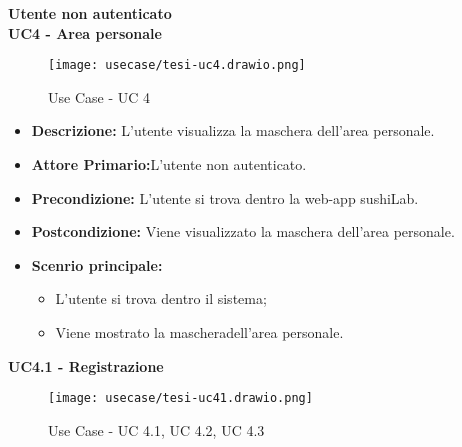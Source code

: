 \textbf{Utente non autenticato}\\
\textbf{UC4 - Area personale}
\begin{figure}[H]
    \centering
    \texttt{[image: usecase/tesi-uc4.drawio.png]}
    \caption{Use Case - UC 4}
\end{figure}
\begin{itemize}
    \item \textbf{Descrizione:} L'utente visualizza la maschera dell'area personale.
    \item \textbf{Attore Primario:}L'utente non autenticato.
    \item \textbf{Precondizione:} L'utente si trova dentro la web-app sushiLab.
    \item \textbf{Postcondizione:} Viene visualizzato la maschera dell'area personale.
    \item \textbf{Scenrio principale:}
    \begin{itemize}
        \item L'utente si trova dentro il sistema;
        \item Viene mostrato la mascheradell'area personale.
    \end{itemize}
\end{itemize}
\textbf{UC4.1 - Registrazione}
\begin{figure}[H]
    \centering
    \texttt{[image: usecase/tesi-uc41.drawio.png]}
    \caption{Use Case - UC 4.1, UC 4.2, UC 4.3}
\end{figure}
